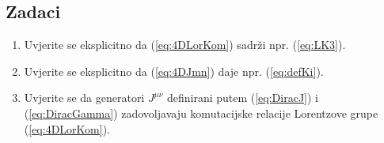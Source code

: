\subsection*{Zadaci}

\begin{enumerate}[{\thechapter}.1]
\item Uvjerite se eksplicitno da (\ref{eq:4DLorKom}) sadrži npr. (\ref{eq:LK3}).

\item Uvjerite se eksplicitno da (\ref{eq:4DJmn}) daje npr. (\ref{eq:defKi}).

\item Uvjerite se da generatori $J^{\mu\nu}$ definirani putem
(\ref{eq:DiracJ}) i (\ref{eq:DiracGamma}) zadovoljavaju komutacijske
relacije Lorentzove grupe (\ref{eq:4DLorKom}).

\end{enumerate}
